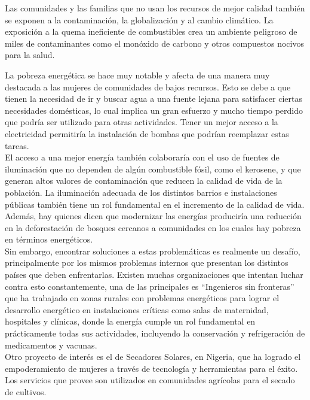 \documentclass{article}
\begin{document}
Las comunidades y las familias que no usan los recursos de mejor calidad también se exponen a la contaminación, la globalización y al cambio climático. La exposición a la quema ineficiente de combustibles crea un ambiente peligroso de miles de contaminantes como el monóxido de carbono y otros compuestos nocivos para la salud.






La pobreza energética se hace muy notable y afecta de una manera muy destacada a las mujeres de comunidades de bajos recursos. Esto se debe a que tienen la necesidad de ir y buscar agua a una fuente lejana para satisfacer ciertas necesidades domésticas, lo cual implica un gran esfuerzo y mucho tiempo perdido que podría ser utilizado para otras actividades. Tener un mejor acceso a la electricidad permitiría la instalación de bombas que podrían reemplazar estas tareas.\\
El acceso a una mejor energía también colaboraría con el uso de fuentes de iluminación que no dependen de algún combustible fósil, como el kerosene, y que generan altos valores de contaminación que reducen la calidad de vida de la población. La iluminación adecuada de los distintos barrios e instalaciones públicas también tiene un rol fundamental en el incremento de la calidad de vida.  Además, hay quienes dicen que modernizar las energías produciría una reducción en la deforestación de bosques cercanos a comunidades en los cuales hay pobreza en términos energéticos.\\
Sin embargo, encontrar soluciones a estas problemáticas es realmente un desafío, principalmente por los mismos problemas internos que presentan los distintos países que deben enfrentarlas. Existen muchas organizaciones que intentan luchar contra esto constantemente, una de las principales es “Ingenieros sin fronteras” que ha trabajado en zonas rurales con problemas energéticos para lograr el desarrollo energético en instalaciones críticas como salas de maternidad, hospitales y clínicas, donde la energía cumple un rol fundamental en prácticamente todas sus actividades, incluyendo la conservación y refrigeración de medicamentos y vacunas.\\
Otro proyecto de interés es el de Secadores Solares, en Nigeria, que ha logrado el empoderamiento de mujeres a través de tecnología y herramientas para el éxito. Los servicios que provee son utilizados en comunidades agrícolas para el secado de cultivos.\\
\end{document}
